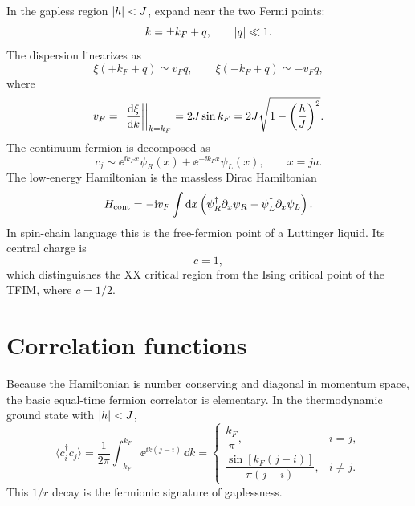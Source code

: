 In the gapless region $\left|h\right|<J$, expand near the two Fermi points:
\begin{equation}
\label{eq:xx-linearization}
    k=\pm k_F+q,
    \qquad
    \left|q\right|\ll1.
\end{equation}
The dispersion linearizes as
\begin{equation}
\label{eq:xx-linear-dispersion}
    \xi(+k_F+q)\simeq v_F q,
    \qquad
    \xi(-k_F+q)\simeq -v_F q,
\end{equation}
where
\begin{equation}
\label{eq:xx-fermi-velocity}
    v_F
    =
    \left.\left|\frac{\mathrm{d} \xi}{\mathrm{d} k}\right|\right|_{k=k_F}
    =
    2J\sin k_F
    =
    2J\sqrt{1-\left(\frac{h}{J}\right)^2}.
\end{equation}
The continuum fermion is decomposed as
\begin{equation}
\label{eq:xx-right-left-decomposition}
    c_j
    \sim
    \ee^{\ii k_F x}\psi_R(x)
    +
    \ee^{-\ii k_F x}\psi_L(x),
    \qquad
    x=ja.
\end{equation}
The low-energy Hamiltonian is the massless Dirac Hamiltonian
\begin{equation}
\label{eq:xx-dirac-continuum-hamiltonian}
    H_{\rm cont}
    =
    -\mathrm{i} v_F\int\mathrm{d} x
    \left(
        \psi_R^\dagger\partial_x\psi_R
        -
        \psi_L^\dagger\partial_x\psi_L
    \right).
\end{equation}
In spin-chain language this is the free-fermion point of a Luttinger liquid.  Its
central charge is
\begin{equation}
\label{eq:xx-central-charge}
    c=1,
\end{equation}
which distinguishes the XX critical region from the Ising critical point of the
TFIM, where $c=1/2$.

\section{Correlation functions}
\label{sec:xx-correlation-functions}

Because the Hamiltonian is number conserving and diagonal in momentum space, the
basic equal-time fermion correlator is elementary.  In the thermodynamic ground
state with $\left|h\right|<J$,
\begin{equation}
\label{eq:xx-fermion-two-point}
    \langle c_i^\dagger c_j\rangle
    =
    \frac{1}{2\pi}\int_{-k_F}^{k_F}
    \ee^{\ii k(j-i)}\,\dd k
    =
    \begin{cases}
        \dfrac{k_F}{\pi}, & i=j,\\[8pt]
        \dfrac{\sin[k_F(j-i)]}{\pi(j-i)}, & i\neq j.
    \end{cases}
\end{equation}
This $1/r$ decay is the fermionic signature of gaplessness.

